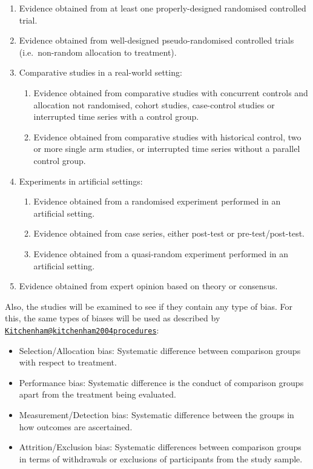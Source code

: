 \documentclass[]{book}
\providecommand{\tightlist}{%
  \setlength{\itemsep}{0pt}\setlength{\parskip}{0pt}}
\begin{document}
\begin{enumerate}
\def\labelenumi{\arabic{enumi}.}
\tightlist
\item
  Evidence obtained from at least one properly-designed randomised
  controlled trial.
\item
  Evidence obtained from well-designed pseudo-randomised controlled
  trials (i.e.~non-random allocation to treatment).
\item
  Comparative studies in a real-world setting:

  \begin{enumerate}
  \def\labelenumii{\arabic{enumii}.}
  \tightlist
  \item
    Evidence obtained from comparative studies with concurrent controls
    and allocation not randomised, cohort studies, case-control studies
    or interrupted time series with a control group.
  \item
    Evidence obtained from comparative studies with historical control,
    two or more single arm studies, or interrupted time series without a
    parallel control group.
  \end{enumerate}
\item
  Experiments in artificial settings:

  \begin{enumerate}
  \def\labelenumii{\arabic{enumii}.}
  \tightlist
  \item
    Evidence obtained from a randomised experiment performed in an
    artificial setting.
  \item
    Evidence obtained from case series, either post-test or
    pre-test/post-test.
  \item
    Evidence obtained from a quasi-random experiment performed in an
    artificial setting.
  \end{enumerate}
\item
  Evidence obtained from expert opinion based on theory or consensus.
\end{enumerate}

Also, the studies will be examined to see if they contain any type of
bias. For this, the same types of biases will be used as described by
\href{mailto:Kitchenham@kitchenham2004procedures}{\nolinkurl{Kitchenham@kitchenham2004procedures}}:

\begin{itemize}
\tightlist
\item
  Selection/Allocation bias: Systematic difference between comparison
  groups with respect to treatment.
\item
  Performance bias: Systematic difference is the conduct of comparison
  groups apart from the treatment being evaluated.
\item
  Measurement/Detection bias: Systematic difference between the groups
  in how outcomes are ascertained.
\item
  Attrition/Exclusion bias: Systematic differences between comparison
  groups in terms of withdrawals or exclusions of participants from the
  study sample.
\end{itemize}
\end{document}
